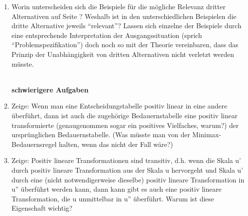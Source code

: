 \begin{enumerate}
\item \label{AufgabeDritteAlternative} Worin unterscheiden sich die Beispiele
für die mögliche Relevanz dritter Alternativen auf Seite \pageref{dritteAlternativen}? 
Weshalb ist in den 
unterschiedlichen Beispielen die dritte Alternative jeweils "`relevant"'?
Lassen sich einzelne der Beispiele durch eine entsprechende Interpretation der
Ausgangssituation (sprich "`Problemspezifikation"') doch noch so mit der Theorie
vereinbaren, dass das Prinzip der Unabhängigkeit von dritten Alternativen nicht
verletzt werden müsste.


~\\{\bf schwierigere Aufgaben}\\

\item Zeige: Wenn man eine Entscheidungstabelle positiv linear in eine andere
überführt, dann ist auch die zugehörige Bedauernstabelle eine positiv linear
transformierte (genaugenommen sogar ein positives Vielfaches, warum?) der
ursprünglichen Bedauernstabelle. (Was müsste man von der Minimax-Bedauernsregel
halten, wenn das nicht der Fall wäre?)

\item Zeige: Positiv lineare Transformationen sind transitiv, d.h. wenn die
Skala u' durch positiv lineare Transformation aus der Skala u hervorgeht und
Skala u' durch eine (nicht notwendigerweise dieselbe) positiv lineare
Transformation in u'' überführt werden kann, dann kann gibt es auch eine
positiv lineare Transformation, die u unmittelbar in u'' überführt. Warum ist
diese Eigenschaft wichtig?


\end{enumerate}

